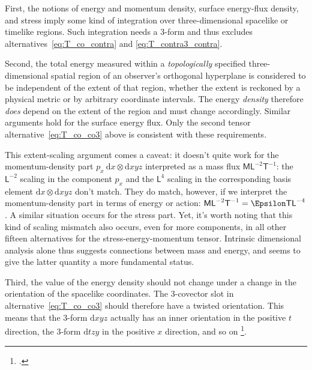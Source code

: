 \documentclass[\ifafour a4paper,12pt,\else a5paper,10pt,\fi%
onecolumn,oneside,article,%
british%
]{memoir}
\theoremstyle{remark}
\theoremstyle{innote}
\newcommand*{\citep}{\footcites}
\newcommand*{\di}{\mathrm{d}}%
\renewcommand*{\|}[1][]{\nonscript\,#1\vert\nonscript\;\mathopen{}}
\newcommand*{\sect}{\S}%
\newcommand*{\cf}{{cf.}}
\newcommand*{\Le}{\textsf{L}}
\newcommand*{\Ti}{\textsf{T}}
\newcommand*{\Ma}{\textsf{M}}
\newcommand*{\En}{\Epsilon}%
\newcommand*{\en}{\epsilon}
\newcommand*{\yp}{p}
\newcommand*{\dixyz}{\di xyz}
\newcommand*{\ditzy}{\di tzy}
\begin{document}
First, the notions of energy and momentum density, surface energy-flux
density, and stress imply some kind of integration over three-dimensional
spacelike or timelike regions. Such integration needs a 3-form and thus
excludes alternatives~\eqref{eq:T_co_contra} and
\eqref{eq:T_contra3_contra}.

Second, the total energy measured within a \emph{topologically} specified
three-dimensional spatial region of an observer's orthogonal hyperplane is
considered to be independent of the extent of that region, whether the
extent is reckoned by a physical metric or by arbitrary coordinate
intervals. %
The energy \emph{density} therefore \emph{does} depend on the extent of the
region and must change accordingly. Similar arguments hold for the surface
energy flux. Only the second tensor alternative~\eqref{eq:T_co_co3} above
is consistent with these requirements.

This extent-scaling argument comes a caveat: it doesn't quite work for the
momentum-density part $\yp_{x}\ \di x\otimes\dixyz$ interpreted as a mass
flux $\Ma\Le^{-2}\Ti^{-1}$: the $\Le^{-2}$ scaling in the component
$\yp_{x}$ and the $\Le^{4}$ scaling in the corresponding basis element
$\di x\otimes\dixyz$ don't match. They do match, however, if we interpret
the momentum-density part in terms of energy or action:
$\Ma\Le^{-2}\Ti^{-1}=\En\Ti\Le^{-4}$. A similar situation occurs for the
stress part. Yet, it's worth noting that this kind of scaling mismatch also
occurs, even for more components, in all other fifteen alternatives for the
stress-energy-momentum tensor. Intrinsic dimensional analysis alone thus
suggests connections between mass and energy, and seems to give the latter
quantity a more fundamental status.

Third, the value of the energy density should not change under a change in
the orientation of the spacelike coordinates. The 3-covector slot in
alternative~\eqref{eq:T_co_co3} should therefore have a twisted
orientation. This means that the 3-form $\dixyz$ actually has an inner
orientation in the positive $t$ direction, the 3-form $\ditzy$ in the
positive $x$ direction, and so on \citep[To visualize this \cf][Fig.~6 and
table in \sect~II.8 p.~31]{schouten1951_r1989}[and][Fig.~22.10]{burke1985_r1987}.
\end{document}
